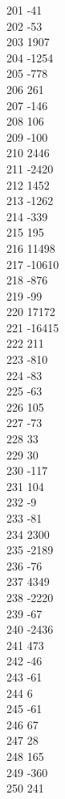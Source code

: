 { 201	-41 \\
 202	-53 \\
 203	1907 \\
 204	-1254 \\
 205	-778 \\
 206	261 \\
 207	-146 \\
 208	106 \\
 209	-100 \\
 210	2446 \\
 211	-2420 \\
 212	1452 \\
 213	-1262 \\
 214	-339 \\
 215	195 \\
 216	11498 \\
 217	-10610 \\
 218	-876 \\
 219	-99 \\
 220	17172 \\
 221	-16415 \\
 222	211 \\
 223	-810 \\
 224	-83 \\
 225	-63 \\
 226	105 \\
 227	-73 \\
 228	33 \\
 229	30 \\
 230	-117 \\
 231	104 \\
 232	-9 \\
 233	-81 \\
 234	2300 \\
 235	-2189 \\
 236	-76 \\
 237	4349 \\
 238	-2220 \\
 239	-67 \\
 240	-2436 \\
 241	473 \\
 242	-46 \\
 243	-61 \\
 244	6 \\
 245	-61 \\
 246	67 \\
 247	28 \\
 248	165 \\
 249	-360 \\
 250	241 \\
}
